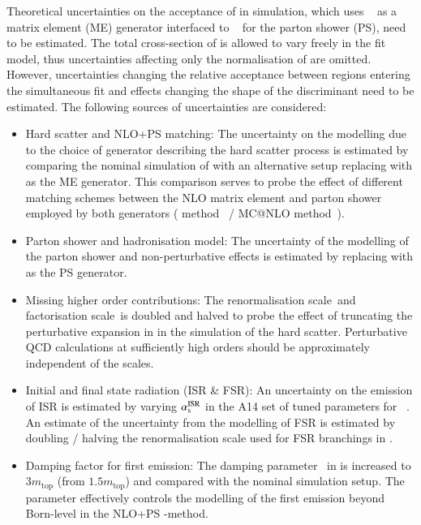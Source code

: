 Theoretical uncertainties on the acceptance of \ttbar in simulation,
which uses \POWHEGBOX[v2]~\cite{Frixione:2007nw} as a matrix element
(ME) generator interfaced to \PYTHIA[8.230]~\cite{Sjostrand:2014zea}
for the parton shower (PS), need to be estimated. The total cross-section
of \ttbar is allowed to vary freely in the fit model, thus
uncertainties affecting only the normalisation of \ttbar are
omitted. However, uncertainties changing the relative acceptance
between regions entering the simultaneous fit and effects changing the
shape of the \mTW discriminant need to be estimated. The following
sources of uncertainties are considered:
\begin{itemize}

\item Hard scatter and NLO+PS matching: The uncertainty on the
  modelling due to the choice of generator describing the hard scatter
  process is estimated by comparing the nominal simulation of \ttbar
  with an alternative setup replacing \POWHEGBOX[v2] with \MGNLO as
  the ME generator. This comparison serves to probe the effect of
  different matching schemes between the NLO matrix element and parton
  shower employed by both generators (\POWHEG
  method~\cite{Nason:2004rx,Frixione:2007vw,Alioli:2010xd} / MC@NLO
  method~\cite{Frixione:2002ik}).

\item Parton shower and hadronisation model: The uncertainty of the
  modelling of the parton shower and non-perturbative effects is
  estimated by replacing \PYTHIA[8] with \HERWIG[7.0.4] as the PS
  generator.

\item Missing higher order contributions: The renormalisation
  scale~\muR and factorisation scale~\muF is doubled and halved to
  probe the effect of truncating the perturbative expansion in \alphas
  in the simulation of the hard scatter. Perturbative QCD calculations
  at sufficiently high orders should be approximately independent of
  the scales.

\item Initial and final state radiation (ISR \& FSR): An uncertainty
  on the emission of ISR is estimated by varying $\alpha_{\text{s}}^\text{ISR}$
  in the A14 set of tuned parameters for
  \PYTHIA[8]~\cite{ATL-PHYS-PUB-2014-021}.
  An estimate of the uncertainty from the modelling of FSR is
  estimated by doubling / halving the renormalisation scale used for
  FSR branchings in \PYTHIA[8].

\item Damping factor for first emission: The damping parameter~\hdamp
  in \POWHEGBOX[v2] is increased to $3 m_\text{top}$ (from
  $1.5 m_\text{top}$) and compared with the nominal simulation
  setup. The \hdamp parameter effectively controls the modelling of
  the first emission beyond Born-level in the NLO+PS \POWHEG-method.
\end{itemize}
